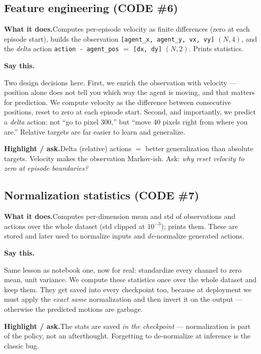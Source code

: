 \documentclass[11pt]{article}
\newenvironment{saythis}{%
  \par\smallskip\noindent
  \begin{list}{}{%
    \setlength{\leftmargin}{1.2em}%
    \setlength{\rightmargin}{0.5em}%
    \setlength{\topsep}{2pt}%
  }\item\relax
  \color{sayrule}\textbf{Say this.}\hspace{0.4em}\color{black}\itshape
}{%
  \end{list}\par\smallskip
}
\newcommand{\highlight}[1]{\par\smallskip\noindent\textcolor{hlcolor}{\textbf{Highlight / ask.}}\hspace{0.4em}#1\par\smallskip}
\newcommand{\whatdoes}[1]{\par\noindent\textbf{What it does.}\hspace{0.4em}#1\par}
\begin{document}
\subsection{Feature engineering (CODE \#6)}
\whatdoes{Computes per-episode velocity as finite differences (zero at each episode start), builds the
observation \texttt{[agent\_x, agent\_y, vx, vy]} $(N,4)$, and the \emph{delta} action
\texttt{action - agent\_pos} $=$ \texttt{[dx, dy]} $(N,2)$. Prints statistics.}
\begin{saythis}
Two design decisions here. First, we enrich the observation with velocity --- position alone does not
tell you which way the agent is moving, and that matters for prediction. We compute velocity as the
difference between consecutive positions, reset to zero at each episode start. Second, and importantly,
we predict a \emph{delta} action: not ``go to pixel 300,'' but ``move 40 pixels right from where you
are.'' Relative targets are far easier to learn and generalize.
\end{saythis}
\highlight{Delta (relative) actions $=$ better generalization than absolute targets. Velocity makes the
observation Markov-ish. Ask: \emph{why reset velocity to zero at episode boundaries?}}

\subsection{Normalization statistics (CODE \#7)}
\whatdoes{Computes per-dimension mean and std of observations and actions over the whole dataset (std
clipped at $10^{-3}$); prints them. These are stored and later used to normalize inputs and
\emph{de}-normalize generated actions.}
\begin{saythis}
Same lesson as notebook one, now for real: standardize every channel to zero mean, unit variance. We
compute these statistics once over the whole dataset and keep them. They get saved into every checkpoint
too, because at deployment we must apply the \emph{exact same} normalization and then invert it on the
output --- otherwise the predicted motions are garbage.
\end{saythis}
\highlight{The stats are saved \emph{in the checkpoint} --- normalization is part of the policy, not an
afterthought. Forgetting to de-normalize at inference is the classic bug.}
\end{document}
